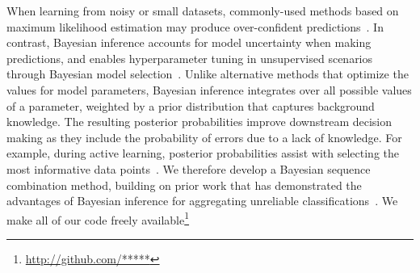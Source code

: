 When learning from noisy or small datasets, commonly-used
methods based on maximum likelihood estimation may produce over-confident predictions~\cite{xiong2011bayesian,srivastava2014dropout}. 
In contrast, Bayesian inference accounts for model uncertainty when making predictions,
and enables hyperparameter tuning in unsupervised scenarios through Bayesian model selection~\cite{Bishop2006}. 
Unlike alternative methods that optimize the values for model parameters, Bayesian inference
integrates over all possible values of a parameter, weighted by a prior distribution that captures background knowledge.
The resulting posterior probabilities improve downstream decision making
as they include the probability of errors due to a lack of knowledge. For example, 
during active learning, posterior probabilities assist with selecting the most informative data points~\cite{settles2010active}.
We therefore develop a Bayesian sequence combination method, building on prior work that has demonstrated the advantages of Bayesian inference for aggregating unreliable classifications~\cite{kim2012bayesian,simpsonlong,Felt2016SemanticAA,paun2018comparing}.
We make 
all of our code freely available\footnote{\url{http://github.com/*****}}



